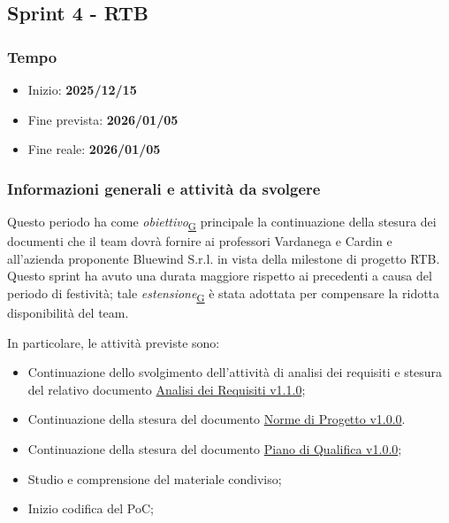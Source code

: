 \documentclass[a4paper,12pt]{article}
\begin{document}
    \subsection{Sprint 4 - RTB}{
        \subsubsection{Tempo}{
            \begin{itemize}
                \item[] Inizio: \textbf{2025/12/15} 
                \item[] Fine prevista: \textbf{2026/01/05} 
                \item[] Fine reale: \textbf{2026/01/05} 
            \end{itemize}
        }
    \subsubsection{Informazioni generali e attività da svolgere}{
        Questo periodo ha come \textit{obiettivo}\textsubscript{\href{https://atlasteam9.github.io/Atlas/glossario.html\#Obiettivo}{G}} principale la continuazione della stesura dei documenti che il team dovrà fornire ai professori Vardanega e Cardin e all'azienda proponente Bluewind S.r.l. in vista della milestone di progetto RTB. Questo sprint ha avuto una durata maggiore rispetto ai precedenti a causa del periodo di festività; tale \textit{estensione}\textsubscript{\href{https://atlasteam9.github.io/Atlas/glossario.html\#Estensione}{G}} è stata adottata per compensare la ridotta disponibilità del team.
        \
    }
            
    \noindent In particolare, le attività previste sono:
            \begin{itemize}
                \item Continuazione dello svolgimento dell'attività di analisi dei requisiti e stesura del relativo documento \href{https://atlasteam9.github.io/Atlas/docs/RTB/documenti/esterni/Analisi%20dei%20Requisiti.pdf}{Analisi dei Requisiti v1.1.0};
                \item Continuazione della stesura del documento \href{https://atlasteam9.github.io/Atlas/docs/RTB/documenti/interni/Norme%20di%20Progetto.pdf}{Norme di Progetto v1.0.0}.
                \item Continuazione della stesura del documento \href{https://atlasteam9.github.io/Atlas/docs/RTB/documenti/esterni/Piano%20di%20Qualifica.pdf}{Piano di Qualifica v1.0.0};
                \item Studio e comprensione del materiale condiviso;
                \item Inizio codifica del PoC;
            \end{itemize}
        }
\end{document}
